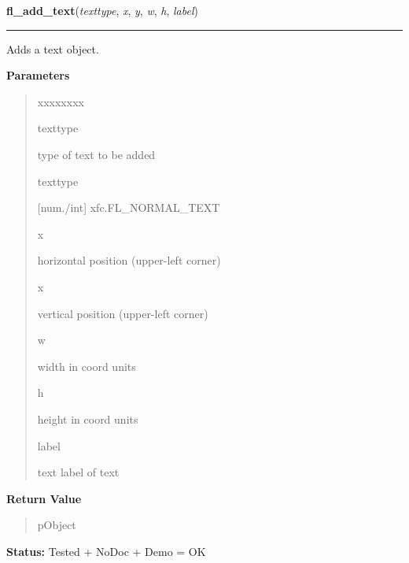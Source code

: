 \hspace{.8\funcindent}\begin{boxedminipage}{\funcwidth}

    \raggedright \textbf{fl\_add\_text}(\textit{texttype}, \textit{x}, \textit{y}, \textit{w}, \textit{h}, \textit{label})

    \vspace{-1.5ex}

    \rule{\textwidth}{0.5\fboxrule}
\setlength{\parskip}{2ex}
    Adds a text object.

\setlength{\parskip}{1ex}
      \textbf{Parameters}
      \vspace{-1ex}

      \begin{quote}
        \begin{Ventry}{xxxxxxxx}

          \item[texttype]

          type of text to be added

          \item[texttype]

          [num./int] xfc.FL\_NORMAL\_TEXT

          \item[x]

          horizontal position (upper-left corner)

          \item[x]

          vertical position (upper-left corner)

          \item[w]

          width in coord units

          \item[h]

          height in coord units

          \item[label]

          text label of text

        \end{Ventry}

      \end{quote}

      \textbf{Return Value}
    \vspace{-1ex}

      \begin{quote}
      pObject

      \end{quote}

\textbf{Status:} Tested + NoDoc + Demo = OK



    \end{boxedminipage}

